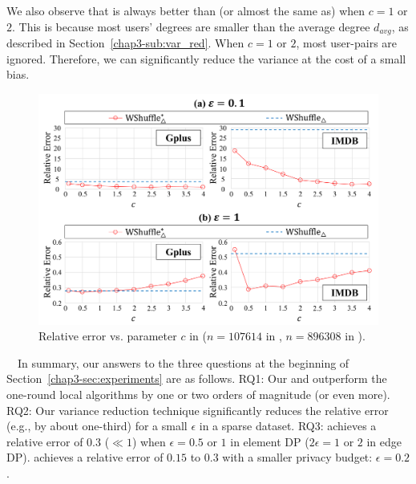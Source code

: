 We also observe that \AlgWSTriVR{} is always better than (or almost the same as) \AlgWSTri{} when $c=1$ or $2$. 
This is because most users' degrees are smaller than the average degree $d_{avg}$, as described in Section~\ref{chap3-sub:var_red}. 
When $c=1$ or $2$, most user-pairs are ignored. 
Therefore, we can significantly reduce the variance at the cost of a small bias. 

\begin{figure}[t]
  \centering
  \includegraphics[width=0.99\linewidth]{fig/res4_thr.pdf}
  \vspace{-4mm}
  \caption{Relative error vs. parameter $c$ in \AlgWSTriVR{} ($n=107614$ in \Gplus{}, $n=896308$ in \IMDB{}).
  }
  \label{chap3-fig:res4_thr}
\end{figure}

\smallskip
{}~~In summary, our answers to the three questions at the beginning of Section~\ref{chap3-sec:experiments} are as follows. 
RQ1: Our \AlgWSTriVR{} and \AlgWSCyc{} outperform the one-round local algorithms by one or two orders of magnitude (or even more). 
RQ2: Our variance reduction technique significantly reduces the relative error (e.g., by about one-third) 
for a small $\epsilon$ in a sparse dataset. 
RQ3: 
\AlgWSTriVR{} achieves a relative error of $0.3$ ($\ll 1$) when $\epsilon=0.5$ or $1$ in element DP ($2\epsilon=1$ or $2$ in edge DP). 
\AlgWSCyc{} achieves a relative error of $0.15$ to $0.3$ with a smaller privacy budget: $\epsilon=0.2$. 